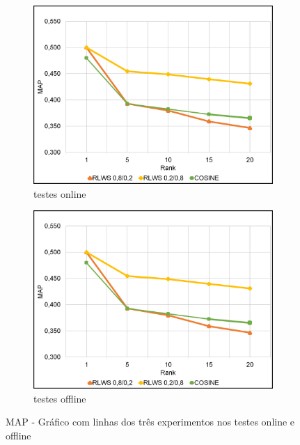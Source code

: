 \begin{figure}
    \begin{subfigure}{.5\textwidth}
        \centering
        \includegraphics[width=.8\linewidth]{imagens/map_results.jpg}
        \caption{testes online}
        \label{fig:map_line_a}
    \end{subfigure}%
    \begin{subfigure}{.5\textwidth}
        \centering
        \includegraphics[width=.8\linewidth]{imagens/map_results.jpg}
        \caption{testes offline}
        \label{fig:map_line_b}
    \end{subfigure}
    \caption{MAP - Gráfico com linhas dos três experimentos nos testes online e offline}
    \label{fig:map_line}
\end{figure}

